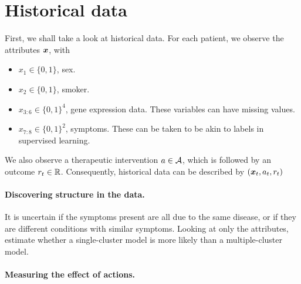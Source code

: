 
\section{Historical data}

First, we shall take a look at historical data. For each patient, we observe the attributes $\bx$, with
\begin{itemize}
\item $x_1 \in \{0,1\}$, sex.
\item $x_2 \in \{0,1\}$, smoker.
\item $x_{3:6} \in \{0,1\}^4$, gene expression data. These variables can have missing values.
\item $x_{7:8} \in \{0,1\}^2$, symptoms. These can be taken to be akin to labels in supervised learning. 
\end{itemize}
We also observe a therapeutic intervention $a \in {\mathcal{A}}$, which is followed by an outcome $r_t \in {\mathbb{R}}$. Consequently, historical data can be described by $(\bx_t, a_t, r_t)$

\paragraph{Discovering structure in the data.}
It is uncertain if the symptoms present are all due to the same disease, or if they are different conditions with similar symptoms. Looking at only the attributes, estimate whether a single-cluster model is more likely than a multiple-cluster model.

\paragraph{Measuring the effect of actions.}













